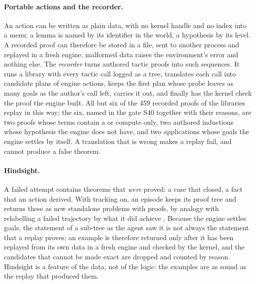 \paragraph{Portable actions and the recorder.}
An action can be written as plain data, with no kernel handle and no index into a menu: a lemma is named by its identifier in the world, a hypothesis by its level.
A recorded proof can therefore be stored in a file, sent to another process and replayed in a fresh engine; malformed data raises the environment's error and nothing else.
The \emph{recorder} turns authored tactic proofs into such sequences.
It runs a library with every tactic call logged as a tree, translates each call into candidate plans of engine actions, keeps the first plan whose probe leaves as many goals as the author's call left, carries it out, and finally has the kernel check the proof the engine built.
All but six of the 459 recorded proofs of the libraries replay in this way; the six, named in the gate S40 together with their reasons, are two proofs whose terms contain a  or compute only, two authored inductions whose hypothesis the engine does not have, and two applications whose goals the engine settles by itself.
A translation that is wrong makes a replay fail, and cannot produce a false theorem.

\paragraph{Hindsight.}
A failed attempt contains theorems that \emph{were} proved: a case that closed, a fact that an action derived.
With tracking on, an episode keeps its proof tree and returns these as new standalone problems with proofs, by analogy with relabelling a failed trajectory by what it did achieve \citep{andrychowicz17}.
Because the engine settles goals, the statement of a sub-tree as the agent saw it is not always the statement that a replay proves; an example is therefore returned only after it has been replayed from its own data in a fresh engine and checked by the kernel, and the candidates that cannot be made exact are dropped and counted by reason.
Hindsight is a feature of the data, not of the logic: the examples are as sound as the replay that produced them.

